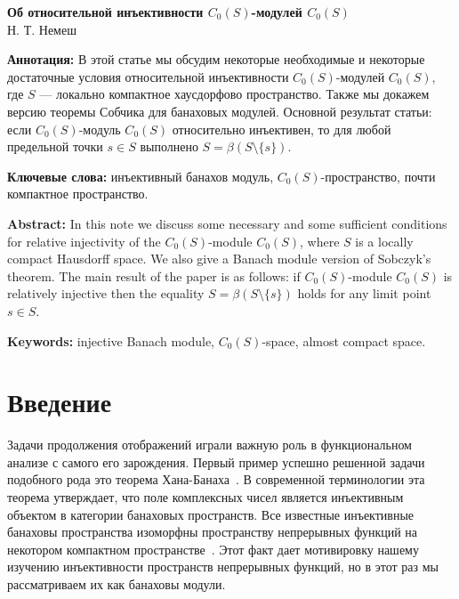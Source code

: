 \documentclass[12pt]{article}
\begin{document}
\begin{center}
    \Large \textbf{Об относительной инъективности $C_0(S)$-модулей
        $C_0(S)$}\\[0.5cm]
    \small {Н. Т. Немеш}\\[0.5cm]
\end{center}

\thispagestyle{empty}

\textbf{Аннотация:} В этой статье мы обсудим некоторые необходимые и некоторые
достаточные условия относительной инъективности $C_0(S)$-модулей $C_0(S)$, где
$S$ --- локально компактное хаусдорфово пространство. Также мы докажем версию
теоремы Собчика для банаховых модулей. Основной результат статьи: если
$C_0(S)$-модуль $C_0(S)$ относительно инъективен, то для любой предельной точки
$s\in S$ выполнено $S=\beta(S\setminus \{s\})$.

\textbf{Ключевые слова:} инъективный банахов модуль, $C_0(S)$-пространство,
почти компактное пространство.

\medskip
\textbf{Abstract:} In this note we discuss some necessary and some sufficient
conditions for relative injectivity of the $C_0(S)$-module $C_0(S)$, where $S$
is a locally compact Hausdorff space. We also give a Banach module version of
Sobczyk's theorem. The main result of the paper is as follows: if
$C_0(S)$-module $C_0(S)$ is relatively injective then  the equality
$S=\beta(S\setminus \{s\})$ holds for any limit point $s\in S$.
\medskip

\textbf{Keywords:} injective Banach module, $C_0(S)$-space, almost compact
space.

\bigskip


\section{Введение}\label{SectionIntroduction}

Задачи продолжения отображений играли важную роль в функциональном анализе с
самого его зарождения. Первый пример успешно решенной задачи подобного рода это
теорема
Хана-Банаха~\cite{HahnLinSystInLinSp,BanachOnLinFuncI,BanachOnLinFuncII}. В
современной терминологии эта теорема утверждает, что поле комплексных чисел
является инъективным объектом в категории банаховых пространств. Все известные
инъективные банаховы пространства изоморфны пространству непрерывных функций на
некотором компактном пространстве~\cite{BlascIvorConstrInjSpCK}. Этот факт дает
мотивировку нашему изучению инъективности пространств непрерывных функций, но в
этот раз мы рассматриваем их как банаховы модули.
\end{document}
